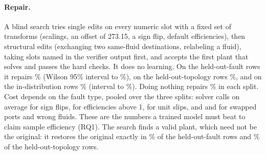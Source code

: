 \paragraph{Repair.}
A blind search tries single edits on every numeric slot with a fixed set of transforms (scalings, an offset of 273.15, a sign flip, default efficiencies), then structural edits (exchanging two same-fluid
destinations, relabeling a fluid), taking slots named in the verifier output first, and accepts the first plant that solves and passes the hard checks. It does no learning. On the
 held-out-fault rows it repairs \% (Wilson 95\% interval  to
\%), on the  held-out-topology rows \%, and on the 
in-distribution rows \% (interval  to \%). Doing nothing repairs \% in each split.
Cost depends on the fault type, pooled over the three splits:  solver calls on average for  sign flips,  for  efficiencies above 1,  for
 unit slips, and  and  for  swapped ports and  wrong fluids. These are the numbers a trained model must beat to
claim sample efficiency (RQ1). The search finds a valid plant, which need not be the original: it restores the original exactly in \% of the held-out-fault rows and \% of the held-out-topology rows.

